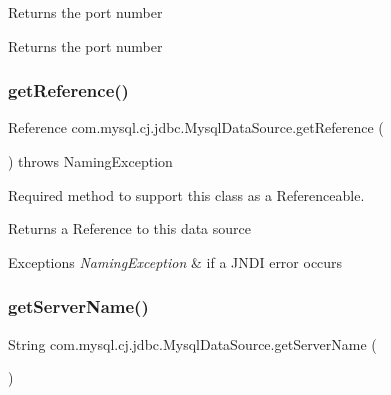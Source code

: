 Returns the port number

\begin{DoxyReturn}{Returns}
the port number 
\end{DoxyReturn}
\mbox{\label{classcom_1_1mysql_1_1cj_1_1jdbc_1_1_mysql_data_source_a6acbbcd3dfbb948cf5231d2bd0a58928}} 
\subsubsection{\texorpdfstring{get\+Reference()}{getReference()}}
{\footnotesize\ttfamily Reference com.\+mysql.\+cj.\+jdbc.\+Mysql\+Data\+Source.\+get\+Reference (\begin{DoxyParamCaption}{ }\end{DoxyParamCaption}) throws Naming\+Exception}

Required method to support this class as a {\ttfamily Referenceable}.

\begin{DoxyReturn}{Returns}
a Reference to this data source
\end{DoxyReturn}

\begin{DoxyExceptions}{Exceptions}
{\em Naming\+Exception} & if a J\+N\+DI error occurs \\
\hline
\end{DoxyExceptions}
\mbox{\label{classcom_1_1mysql_1_1cj_1_1jdbc_1_1_mysql_data_source_acca69f2259888471ef39586befb8ec61}} 
\subsubsection{\texorpdfstring{get\+Server\+Name()}{getServerName()}}
{\footnotesize\ttfamily String com.\+mysql.\+cj.\+jdbc.\+Mysql\+Data\+Source.\+get\+Server\+Name (\begin{DoxyParamCaption}{ }\end{DoxyParamCaption})}

